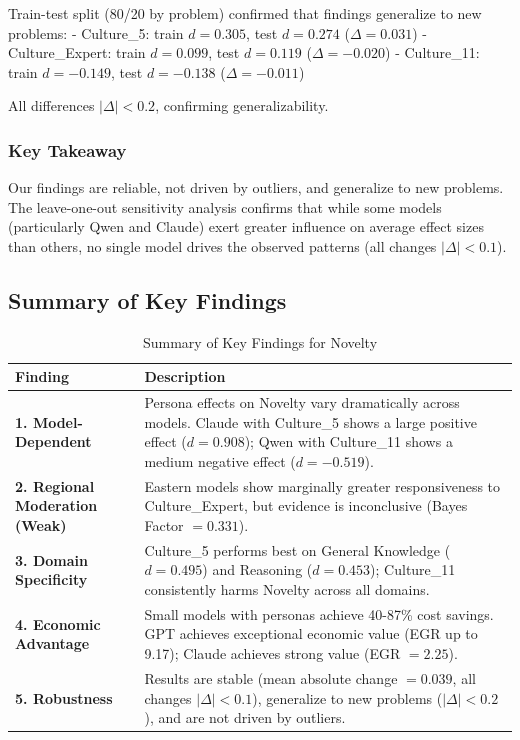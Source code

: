 \documentclass{article}
\begin{document}
Train-test split (80/20 by problem) confirmed that findings generalize to new problems:
- Culture\_5: train $d = 0.305$, test $d = 0.274$ ($\Delta = 0.031$)
- Culture\_Expert: train $d = 0.099$, test $d = 0.119$ ($\Delta = -0.020$)
- Culture\_11: train $d = -0.149$, test $d = -0.138$ ($\Delta = -0.011$)

All differences $|\Delta| < 0.2$, confirming generalizability.

\subsubsection{Key Takeaway}

Our findings are reliable, not driven by outliers, and generalize to new problems. The leave-one-out sensitivity analysis confirms that while some models (particularly Qwen and Claude) exert greater influence on average effect sizes than others, no single model drives the observed patterns (all changes $|\Delta| < 0.1$).

\subsection{Summary of Key Findings}

\begin{table}[H]
\centering
\caption{Summary of Key Findings for Novelty}
\label{tab:key_findings_novelty}
\begin{tabular}{p{3cm}p{9.5cm}}
\toprule
\textbf{Finding} & \textbf{Description} \\
\midrule
\textbf{1. Model-Dependent} & Persona effects on Novelty vary dramatically across models. Claude with Culture\_5 shows a large positive effect ($d = 0.908$); Qwen with Culture\_11 shows a medium negative effect ($d = -0.519$). \\
\midrule
\textbf{2. Regional Moderation (Weak)} & Eastern models show marginally greater responsiveness to Culture\_Expert, but evidence is inconclusive (Bayes Factor $= 0.331$). \\
\midrule
\textbf{3. Domain Specificity} & Culture\_5 performs best on General Knowledge ($d = 0.495$) and Reasoning ($d = 0.453$); Culture\_11 consistently harms Novelty across all domains. \\
\midrule
\textbf{4. Economic Advantage} & Small models with personas achieve 40-87\% cost savings. GPT achieves exceptional economic value (EGR up to 9.17); Claude achieves strong value (EGR $= 2.25$). \\
\midrule
\textbf{5. Robustness} & Results are stable (mean absolute change $= 0.039$, all changes $|\Delta| < 0.1$), generalize to new problems ($|\Delta| < 0.2$), and are not driven by outliers. \\
\bottomrule
\end{tabular}
\end{table}
\end{document}
